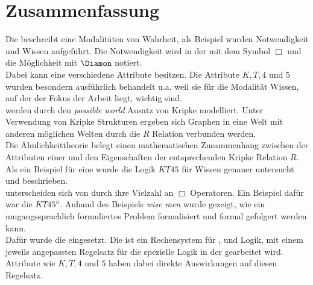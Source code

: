 
\chapter{Zusammenfassung} %
\label{sec:zusammenfassung}

Die \ML beschreibt eine Modalitäten von Wahrheit,
als Beispiel wurden Notwendigkeit und Wissen aufgeführt.
Die Notwendigkeit wird in der \ML mit dem Symbol $\Box$ und die Möglichkeit mit $\Diamon$ notiert.\\
Dabei kann eine \ML verschiedene Attribute besitzen.
Die Attribute $K, T, 4$ und $5$ wurden besondern ausführlich behandelt u.a. weil sie für die Modalität Wissen, auf der der Fokus der Arbeit liegt, wichtig sind.\\
\ML werden durch den \emph{possible world} Ansatz von Kripke modelliert.
Unter Verwendung von Kripke Strukturen ergeben sich Graphen in eine Welt mit anderen möglichen Welten durch die $R$ Relation verbunden werden.\\
Die Ähnlichkeittheorie belegt einen mathematischen Zusammenhang zwischen der Attributen einer \ML und den Eigenschaften der entsprechenden Kripke Relation $R$.\\
Als ein Beispiel für eine \ML wurde die Logik $KT45$ für Wissen genauer untersucht und beschrieben.\\
\MML unterscheiden sich von \ML durch ihre Vielzahl an $\Box$ Operatoren.
Ein Beispiel dafür war die \MML $KT45^n$.
Anhand des Beispiels \emph{wise men} wurde gezeigt, wie ein umgangssprachlich formuliertes Problem formalisiert und formal gefolgert werden kann.\\
Dafür wurde die \ND eingesetzt.
Die \ND ist ein Rechensystem für \AL, \ML und \MML Logik, mit einem jeweils angepassten Regelsatz für die spezielle Logik in der gearbeitet wird.
Attribute wie $K, T, 4$ und $5$ haben dabei direkte Auswirkungen auf diesen Regelsatz.


